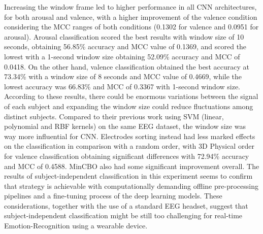 Increasing the window frame led to higher performance in all \ac{CNN} architectures, for both arousal and valence, with a higher improvement of the valence condition considering the \ac{MCC} ranges of both conditions (0.1302 for valence and 0.0951 for arousal). Arousal classification scored the best results with window size of 10 seconds, obtaining 56.85\% accuracy and \ac{MCC} value of 0.1369, and scored the lowest with a 1-second window size obtaining 52.09\% accuracy and \ac{MCC} of 0.0418. On the other hand, valence classification obtained the best accuracy at 73.34\% with a window size of 8 seconds and \ac{MCC} value of 0.4669, while the lowest accuracy was 66.83\% and \ac{MCC} of 0.3367 with 1-second window size. According to these results, there could be enormous variations between the signal of each subject and expanding the window size could reduce fluctuations among distinct subjects. Compared to their previous work using \ac{SVM} (linear, polynomial and RBF kernels) on the same EEG dataset, the window size was way more influential for \ac{CNN}. Electrodes sorting instead had less marked effects on the classification in comparison with a random order, with 3D Physical order for valence classification obtaining significant differences with 72.94\% accuracy and \ac{MCC} of 0.4588. MinCBO also had some significant improvement overall. The results of subject-independent classification in this experiment seems to confirm that strategy is achievable with computationally demanding offline pre-processing pipelines and a fine-tuning process of the deep learning models. These considerations, together with the use of a standard \ac{EEG} headset, suggest that subject-independent classification might be still too challenging for real-time Emotion-Recognition using a wearable device. 
\\
\\
